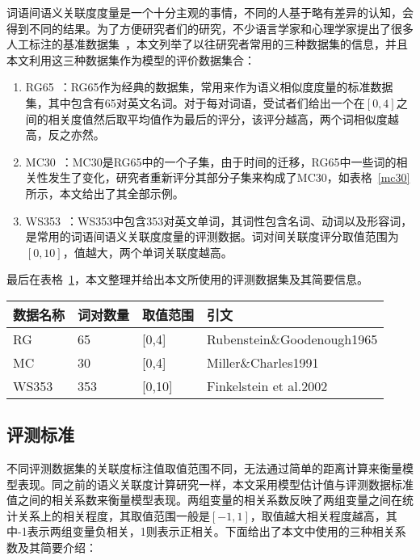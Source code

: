 词语间语义关联度度量是一个十分主观的事情，不同的人基于略有差异的认知，会得到不同的结果。为了方便研究者们的研究，不少语言学家和心理学家提出了很多人工标注的基准数据集~\cite{MC30/Miller02, RG65/RubensteinG65, wordsim353/FinkelsteinGMRSWR02, ws/AgirreAHKPS09, YP130/Yang06verbsimilarity, MEN/BruniTB14}，本文列举了以往研究者常用的三种数据集的信息，并且本文利用这三种数据集作为模型的评价数据集合：
\begin{enumerate}[（1）]
    \item RG65~\cite{RG65/RubensteinG65}：RG65作为经典的数据集，常用来作为语义相似度度量的标准数据集，其中包含有65对英文名词。对于每对词语，受试者们给出一个在$[0,4]$之间的相关度值然后取平均值作为最后的评分，该评分越高，两个词相似度越高，反之亦然。
    \item MC30~\cite{MC30/Miller02}：MC30是RG65中的一个子集，由于时间的迁移，RG65中一些词的相关性发生了变化，研究者重新评分其部分子集来构成了MC30，如表格~\ref{mc30}所示，本文给出了其全部示例。
    \item WS353~\cite{wordsim353/FinkelsteinGMRSWR02}：WS353中包含353对英文单词，其词性包含名词、动词以及形容词，是常用的词语间语义关联度度量的评测数据。词对间关联度评分取值范围为$[0,10]$，值越大，两个单词关联度越高。
\end{enumerate}
最后在表格~\ref{golden}，本文整理并给出本文所使用的评测数据集及其简要信息。

\begin{table}[htbp]
    \center
    \vspace{5pt}
    \begin{tabular}{|p{1.8cm}|p{1.8cm}|p{1.8cm}|p{5cm}|}
    \hline
    数据名称    & 词对数量    & 取值范围      & 引文 \\ \hline
    RG        & 65         & [0,4]       & Rubenstein\&Goodenough1965       \\ \hline
    MC        & 30         & [0,4]       & Miller\&Charles1991          \\ \hline 
    WS353     & 353        & [0,10]      & Finkelstein et al.2002         \\ \hline
    \end{tabular}
    \label{golden}
\end{table}

\subsection{评测标准}
不同评测数据集的关联度标注值取值范围不同，无法通过简单的距离计算来衡量模型表现。同之前的语义关联度计算研究一样，本文采用模型估计值与评测数据标准值之间的相关系数来衡量模型表现。两组变量的相关系数反映了两组变量之间在统计关系上的相关程度，其取值范围一般是$[-1, 1]$，取值越大相关程度越高，其中-1表示两组变量负相关，1则表示正相关。下面给出了本文中使用的三种相关系数及其简要介绍：

